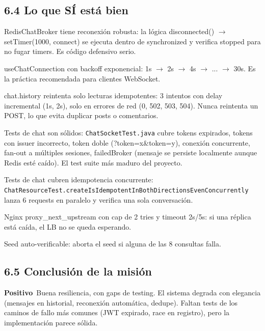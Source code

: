 \documentclass[10pt,a4paper]{article}
\newcommand{\code}[1]{\nolinkurl{#1}}
\newcommand{\badgePositivo}{\colorbox{green!20}{\textcolor{green!60!black}{\textbf{\footnotesize Positivo}}}}
\begin{document}
\subsection{6.4 Lo que SÍ está bien}
RedisChatBroker tiene reconexión robusta: la lógica disconnected() $\rightarrow$ setTimer(1000, connect) se ejecuta dentro de synchronized y verifica stopped para no fugar timers. Es código defensivo serio.\par\vspace{0.4em}
useChatConnection con backoff exponencial: 1s $\rightarrow$ 2s $\rightarrow$ 4s $\rightarrow$ ... $\rightarrow$ 30s. Es la práctica recomendada para clientes WebSocket.\par\vspace{0.4em}
chat.history reintenta solo lecturas idempotentes: 3 intentos con delay incremental (1s, 2s), solo en errores de red (0, 502, 503, 504). Nunca reintenta un POST, lo que evita duplicar posts o comentarios.\par\vspace{0.4em}
Tests de chat son sólidos: \code{ChatSocketTest.java} cubre tokens expirados, tokens con issuer incorrecto, token doble (?token=x\&token=y), conexión concurrente, fan-out a múltiples sesiones, failedBroker (mensaje se persiste localmente aunque Redis esté caído). El test suite más maduro del proyecto.\par\vspace{0.4em}
Tests de chat cubren idempotencia concurrente: \code{ChatResourceTest.createIsIdempotentInBothDirectionsEvenConcurrently} lanza 6 requests en paralelo y verifica una sola conversación.\par\vspace{0.4em}
Nginx proxy\_next\_upstream con cap de 2 tries y timeout 2s/5s: si una réplica está caída, el LB no se queda esperando.\par\vspace{0.4em}
Seed auto-verificable: aborta el seed si alguna de las 8 consultas falla.\par\vspace{0.4em}
\subsection{6.5 Conclusión de la misión}
\badgePositivo\  Buena resiliencia, con gaps de testing. El sistema degrada con elegancia (mensajes en historial, reconexión automática, dedupe). Faltan tests de los caminos de fallo más comunes (JWT expirado, race en registro), pero la implementación parece sólida.\par\vspace{0.4em}
\end{document}
